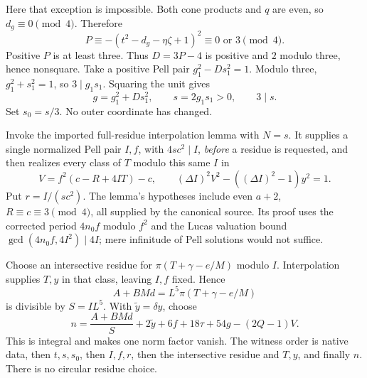 \documentclass[11pt]{article}
\begin{document}
Here that exception is impossible. Both cone products and $q$ are even,
so $d_g\equiv0\pmod4$. Therefore
\[
 P\equiv-(t^2-d_g-\eta\zeta+1)^2\equiv0\text{ or }3\pmod4.
\]
Positive $P$ is at least three. Thus $D=3P-4$ is positive and
$2$ modulo three, hence nonsquare. Take a positive Pell pair
$g_1^2-Ds_1^2=1$. Modulo three, $g_1^2+s_1^2=1$, so
$3\mid g_1s_1$. Squaring the unit gives
\[
 g=g_1^2+Ds_1^2,\qquad s=2g_1s_1>0,
 \qquad 3\mid s.
\]
Set $s_0=s/3$. No outer coordinate has changed.

Invoke the imported full-residue interpolation lemma with $N=s$.
It supplies a single normalized Pell pair $I,f$, with $4sc^2\mid I$,
\emph{before} a residue is requested, and then realizes every class
of $T$ modulo this same $I$ in
\[
 V=f^2(c-R+4IT)-c,\qquad
 (\Delta I)^2V^2-((\Delta I)^2-1)y^2=1.
\]
Put $r=I/(sc^2)$. The lemma's hypotheses include even $a+2$,
$R\equiv c\equiv3\pmod4$, all supplied by the canonical source.
Its proof uses the corrected period $4n_0f$ modulo $f^2$ and the
Lucas valuation bound $\gcd(4n_0f,4I^2)\mid4I$; mere infinitude of
Pell solutions would not suffice.

Choose an intersective residue for
$\pi(T+\gamma-e/M)$ modulo $I$. Interpolation supplies $T,y$ in that
class, leaving $I,f$ fixed. Hence
\[
 A+BMd=L^5\pi(T+\gamma-e/M)
\]
is divisible by $S=IL^5$. With $\widetilde y=\delta y$, choose
\[
 n=\frac{A+BMd}{S}+2\widetilde y+6f+18\tau+54g-(2Q-1)V.
\]
This is integral and makes one norm factor vanish. The witness order is
native data, then $t,s,s_0$, then $I,f,r$, then the intersective residue
and $T,y$, and finally $n$. There is no circular residue choice.
\end{document}
